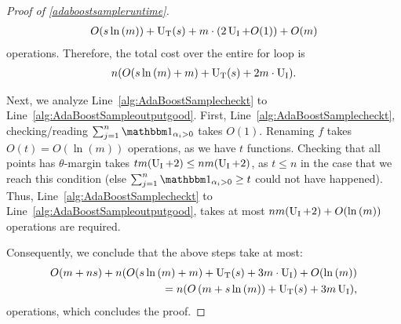 \begin{proof}[Proof of \cref{adaboostsampleruntime}]
\begin{align*}
    O(s\ln{\left(m \right)})+\operatorname{U_{T}}(s)+m\cdot (2\operatorname{U_{I}}+O(1))+O(m)
\end{align*}
operations. Therefore, the total cost over the entire for loop is
\begin{align*}
    n(O(s\ln{\left(m \right)}+m)+\operatorname{U_{T}}(s)+2m\cdot \operatorname{U_{I}}).
\end{align*}

Next, we analyze Line~\ref{alg:AdaBoostSamplecheckt} to Line~\ref{alg:AdaBoostSampleoutputgood}. First, Line~\ref{alg:AdaBoostSamplecheckt}, checking/reading $\sum_{j=1}^{n}\ind_{\alpha_{i}>0}$ takes $O(1)$. Renaming $f$ takes $O(t)=O(\ln{(m)})$ operations, as we have $t$ functions. Checking that all points has $ \theta $-margin takes $ tm (\operatorname{U_{I}}+2)\leq nm(\operatorname{U_{I}}+2) $, as $ t\leq n $ in the case that we reach this condition (else $\sum_{j=1}^{n}\ind_{\alpha_{i}>0}\geq t$ could not have happened). Thus, Line~\ref{alg:AdaBoostSamplecheckt} to Line~\ref{alg:AdaBoostSampleoutputgood}, takes at most $nm(\operatorname{U_{I}}+2)+O(\ln{\left(m \right)})$ operations are required.

Consequently, we conclude that the above steps take at most:
\begin{align*}
  O(m+ns)+n(O(s\ln{\left(m \right)}+m)+\operatorname{U_{T}}(s)+3m\cdot \operatorname{U_{I}})+O(\ln{(m)})\\
  =n(O\left(m+s\ln{\left(m \right)}\right)+\operatorname{U_{T}}(s)+3m\operatorname{U_{I}}),
\end{align*}
operations, which concludes the proof. 
\end{proof}